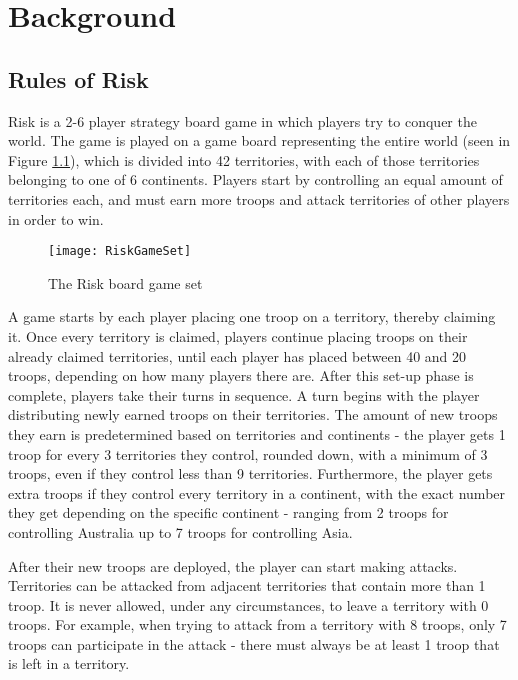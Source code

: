 \graphicspath{ {./Images/} }
\chapter{Background}
\label{background}
\section{Rules of Risk}
\label{rulesOfRisk}

Risk \cite{riskrules} is a 2-6 player strategy board game in which players try to conquer the world. The game is played on a game board representing the entire world (seen in Figure \ref{fig:RiskGameSet}), which is divided into 42 territories, with each of those territories belonging to one of 6 continents. Players start by controlling an equal amount of territories each, and must earn more troops and attack territories of other players in order to win.

\begin{figure}[H]
\texttt{[image: RiskGameSet]}
\caption{The Risk board game set}
\label{fig:RiskGameSet}
\end{figure}

A game starts by each player placing one troop on a territory, thereby claiming it. Once every territory is claimed, players continue placing troops on their already claimed territories, until each player has placed between 40 and 20 troops, depending on how many players there are. After this set-up phase is complete, players take their turns in sequence. A turn begins with the player distributing newly earned troops on their territories. The amount of new troops they earn is predetermined based on territories and continents - the player gets 1 troop for every 3 territories they control, rounded down, with a minimum of 3 troops, even if they control less than 9 territories. Furthermore, the player gets extra troops if they control every territory in a continent, with the exact number they get depending on the specific continent - ranging from 2 troops for controlling Australia up to 7 troops for controlling Asia.

After their new troops are deployed, the player can start making attacks. Territories can be attacked from adjacent territories that contain more than 1 troop. It is never allowed, under any circumstances, to leave a territory with 0 troops. For example, when trying to attack from a territory with 8 troops, only 7 troops can participate in the attack - there must always be at least 1 troop that is left in a territory. 

